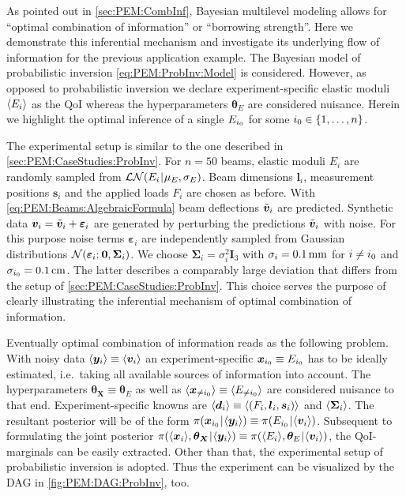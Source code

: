 As pointed out in \cref{sec:PEM:CombInf}, Bayesian multilevel modeling allows for ``optimal combination of information'' or ``borrowing strength''.
Here we demonstrate this inferential mechanism and investigate its underlying flow of information for the previous application example.
The Bayesian model of probabilistic inversion \cref{eq:PEM:ProbInv:Model} is considered.
However, as opposed to probabilistic inversion we declare experiment-specific elastic moduli \(\langle{E_i}\rangle\) as the QoI whereas the hyperparameters \(\bm{\theta}_E\) are considered nuisance.
Herein we highlight the optimal inference of a single \(E_{i_0}\) for some \(i_0 \in \{1,\ldots,n\}\).
\par %
The experimental setup is similar to the one described in \cref{sec:PEM:CaseStudies:ProbInv}.
For \(n=50\) beams, elastic moduli \(E_i\) are randomly sampled from \(\mathcal{LN}(E_i {\:\!}|{\:\!} \mu_E,\sigma_E)\).
Beam dimensions \(\bm{l}_i\), measurement positions \(\bm{s}_i\) and the applied loads \(F_i\) are chosen as before.
With \cref{eq:PEM:Beams:AlgebraicFormula} beam deflections \(\tilde{\bm{v}}_i\) are predicted.
Synthetic data \(\bm{v}_i = \tilde{\bm{v}}_i + \bm{\varepsilon}_i\) are generated by perturbing the predictions \(\tilde{\bm{v}}_i\) with noise.
For this purpose noise terms \(\bm{\varepsilon}_i\) are independently sampled from Gaussian distributions \(\mathcal{N}(\bm{\varepsilon}_i ;{\:\!} \bm{0},\bm{\Sigma}_i)\).
We choose \(\bm{\Sigma}_i = \sigma_i^2 \bm{I}_3\) with \(\sigma_i = \unit[0.1]{mm}\) for \(i \neq i_0\) and \(\sigma_{\analyzed} = \unit[0.1]{cm}\).
The latter describes a comparably large deviation that differs from the setup of \cref{sec:PEM:CaseStudies:ProbInv}.
This choice serves the purpose of clearly illustrating the inferential mechanism of optimal combination of information.
\par %
Eventually optimal combination of information reads as the following problem.
With noisy data \(\langle{\bm{y}_i}\rangle \equiv \langle{\bm{v}_i}\rangle\) an experiment-specific \(\bm{x}_{i_0} \equiv E_{i_0}\) has to be ideally estimated, i.e.\ taking all available sources of information into account.
The hyperparameters \(\bm{\theta}_{\bm{X}} \equiv \bm{\theta}_E\) as well as \(\langle{\bm{x}_{\neq i_0}}\rangle \equiv \langle{E_{\neq i_0}}\rangle\) are considered nuisance to that end.
Experiment-specific knowns are \(\langle{\bm{d}_i}\rangle \equiv \langle{(F_i,\bm{l}_i,\bm{s}_i)}\rangle\) and \(\langle{\bm{\Sigma}_i}\rangle\).
The resultant posterior will be of the form \(\pi(\bm{x}_{i_0} {\:\!}|{\:\!} \langle{\bm{y}_i}\rangle) \equiv \pi(E_{i_0} {\:\!}|{\:\!} \langle{\bm{v}_i}\rangle)\).
Subsequent to formulating the joint posterior \(\pi( \langle{\bm{x}_i}\rangle,\bm{\theta}_{\bm{X}} {\:\!}|{\:\!} \langle{\bm{y}_i}\rangle) \equiv \pi( \langle{E_i}\rangle,\bm{\theta}_E {\:\!}|{\:\!} \langle{\bm{v}_i}\rangle)\), the QoI-marginals can be easily extracted.
Other than that, the experimental setup of probabilistic inversion is adopted.
Thus the experiment can be visualized by the DAG in \cref{fig:PEM:DAG:ProbInv}, too.

